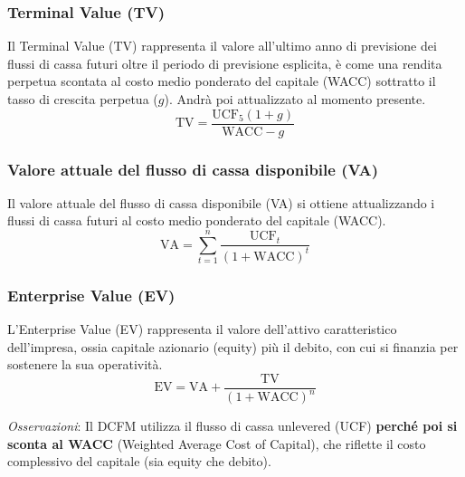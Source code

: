 \documentclass[a4paper,10pt]{article}
\begin{document}
\subsubsection{Terminal Value (TV)}
Il Terminal Value (TV) rappresenta il valore all'ultimo anno di previsione dei flussi di cassa futuri oltre il periodo di previsione esplicita, è come una rendita perpetua scontata al costo medio ponderato del capitale (WACC) sottratto il tasso di crescita perpetua ($g$).
Andrà poi attualizzato al momento presente.
\[\text{TV} = \frac{\text{UCF}_{5}(1+g)}{\text{WACC} - g}\]

\subsubsection{Valore attuale del flusso di cassa disponibile (VA)}
Il valore attuale del flusso di cassa disponibile (VA) si ottiene attualizzando i flussi di cassa futuri al costo medio ponderato del capitale (WACC).
\[\text{VA} = \sum_{t=1}^{n} \frac{\text{UCF}_t}{(1 + \text{WACC})^t}\]
\subsubsection{Enterprise Value (EV)}
L'Enterprise Value (EV) rappresenta il valore dell'attivo caratteristico dell'impresa, ossia capitale azionario (equity) più il debito, con cui si finanzia per sostenere la sua operatività. 
\[\text{EV} = \text{VA} + \frac{\text{TV}}{(1+\text{WACC})^n} \]

\textit{Osservazioni}: Il DCFM utilizza il flusso di cassa unlevered (UCF) \textbf{perché poi si sconta al WACC} (Weighted Average Cost of Capital), che riflette il costo complessivo del capitale (sia equity che debito). 
\end{document}
